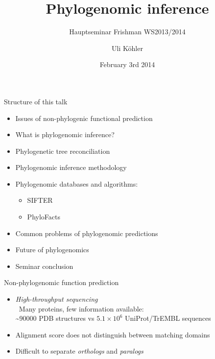 \documentclass[14pt,xcolor=dvipsnames,pdftex]{beamer}
\title{Phylogenomic inference}
\subtitle{Hauptseminar Frishman WS2013/2014}
\author{Uli Köhler}
\date{February 3rd 2014}
\begin{document}
\bgroup
{}

\begin{frame}[plain]{}
\end{frame}

\egroup

\frame{\titlepage}

\begin{frame}{Structure of this talk}
\begin{itemize}
\item Issues of non-phylogenic functional prediction
\item What is phylogenomic inference?
\item Phylogenetic tree reconciliation
\item Phylogenomic inference methodology
\item Phylogenomic databases and algorithms:
\begin{itemize}
 \item SIFTER
 \item PhyloFacts
\end{itemize}
\item Common problems of phylogenomic predictions
\item Future of phylogenomics
\item Seminar conclusion
\end{itemize}
\end{frame}

\begin{frame}{Non-phylogenomic function prediction}
 \begin{itemize}
  \item \textit{High-throughput sequencing}\\
  \textrightarrow\ Many proteins, few information available:\\
  \textasciitilde $90000$ PDB structures vs $5.1\times10^6$ UniProt/TrEMBL sequences
  \item Alignment score does not distinguish between matching domains
  \item Difficult to separate \textit{orthologs} and \textit{paralogs}
 \end{itemize}
\end{frame}
\end{document}
